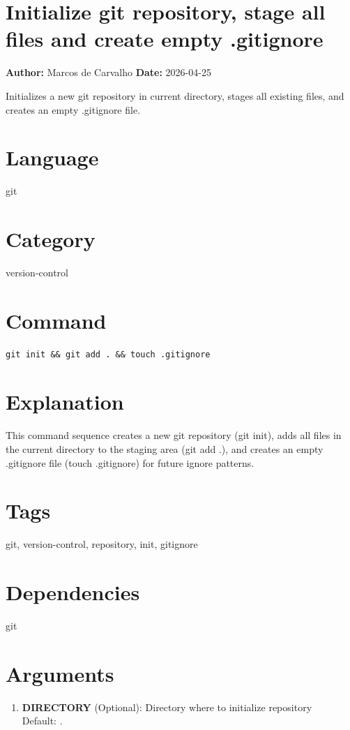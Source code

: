 \documentclass[openany]{book}
\begin{document}
\section*{Initialize git repository, stage all files and create empty .gitignore}
\textbf{Author:} Marcos de Carvalho \hfill \textbf{Date:} 2026-04-25

\noindent Initializes a new git repository in current directory, stages all existing files, and creates an empty .gitignore file.

\section*{Language}
git

\section*{Category}
version-control

\section*{Command}
\begin{lstlisting}
git init && git add . && touch .gitignore
\end{lstlisting}

\section*{Explanation}
This command sequence creates a new git repository (git init), adds all files in the current directory to the staging area (git add .), and creates an empty .gitignore file (touch .gitignore) for future ignore patterns.

\section*{Tags}
git, version-control, repository, init, gitignore

\section*{Dependencies}
git


\section*{Arguments}
\begin{enumerate}
  \item \textbf{DIRECTORY} (Optional): Directory where to initialize repository \\ Default: .
\end{enumerate}
\end{document}

